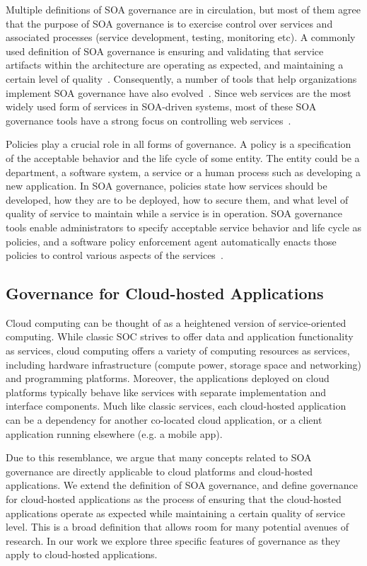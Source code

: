 Multiple definitions of SOA governance
are in circulation, but most of them agree that the purpose of SOA governance is to exercise control over
services and associated processes (service development, testing, monitoring etc). A commonly used definition
of SOA governance is ensuring and validating that service artifacts within the architecture are operating
as expected, and maintaining a certain level of quality~\cite{gartner-soa-gov}.
Consequently, a number of tools that help organizations implement SOA governance 
have also evolved~\cite{Schepers:2008:LAS:1363686.1363932,4730489,6478236,5577268}.
Since web services are the most widely used form of services in SOA-driven systems, most of these
SOA governance tools have a strong focus on controlling web services~\cite{6094008}. 

Policies play a crucial role in all forms of governance. A policy is a specification of the acceptable behavior
and the life cycle of some entity. The entity could be a department, a software system, a service or a 
human process such as developing
a new application. In SOA governance, policies state how services should be developed, how they are to be
deployed, how to secure them, and what level of quality of service to maintain while a service is in operation.
SOA governance tools enable administrators to specify acceptable service behavior and life cycle as policies, and
a software policy enforcement agent automatically enacts those policies to control various aspects of the 
services~\cite{5976827,4483228,4279691}. 

\subsection{Governance for Cloud-hosted Applications}
Cloud computing can be thought of as a heightened version of service-oriented computing. While classic
SOC strives to offer data and application functionality as services, cloud computing offers a variety
of computing resources
as services, including hardware infrastructure (compute power, storage space and networking) and programming
platforms. Moreover, the applications deployed on cloud platforms typically behave like services with
separate implementation and interface components. 
Much like classic services, each cloud-hosted application 
can be a dependency for another
co-located cloud application, or a client application running elsewhere (e.g. a mobile app). 

Due to this resemblance, we argue that many concepts related to SOA governance are
directly applicable to cloud platforms and cloud-hosted applications. 
We extend the definition of SOA governance, and define governance for cloud-hosted applications
as the process of ensuring that the cloud-hosted applications
operate as expected while maintaining a certain quality of service level.
This is a broad definition that allows room for many potential avenues of research.
In our work we explore three specific features of governance as they apply to cloud-hosted applications.

